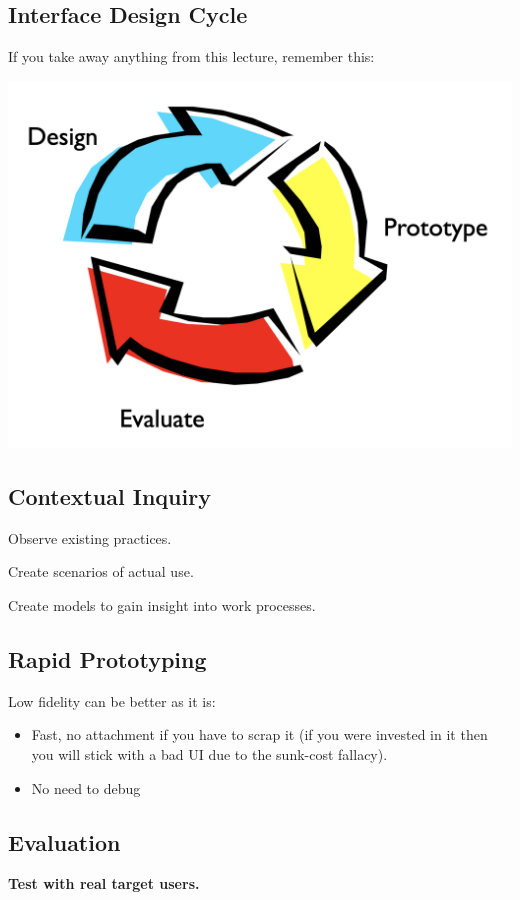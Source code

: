\subsection{Interface Design Cycle}
If you take away anything from this lecture, remember this:
\begin{center}
    \includegraphics[scale=0.15]{lectures/wk1/img/cycle.png}
\end{center}

\subsection{Contextual Inquiry}
Observe existing practices.

Create scenarios of actual use.

Create models to gain insight  into work processes.

\subsection{Rapid Prototyping}
Low fidelity can be better as it is:
\begin{itemize}
    \item Fast, no attachment if you have to scrap it (if you were invested in it then you will stick with a bad UI due to the sunk-cost fallacy).
    \item No need to debug
\end{itemize}

\subsection{Evaluation}
\textbf{Test with real target users.}

